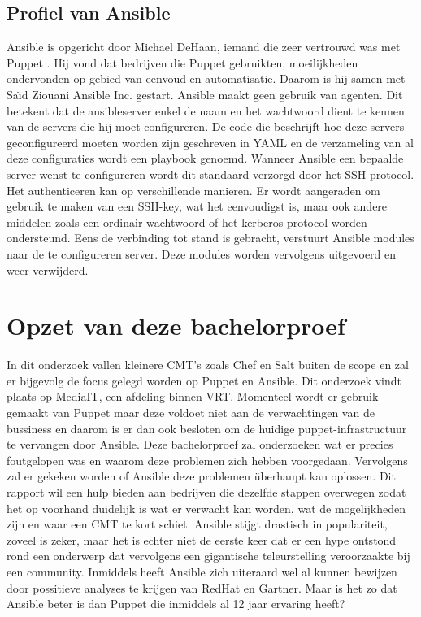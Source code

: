 \subsection{Profiel van Ansible}
Ansible is opgericht door Michael DeHaan, iemand die zeer vertrouwd was met Puppet \autocite{ansiblefordevops}. Hij vond dat bedrijven die Puppet gebruikten, moeilijkheden ondervonden op gebied van eenvoud en automatisatie. Daarom is hij samen met Sa{\"\i}d Ziouani Ansible Inc. gestart. 
Ansible maakt geen gebruik van agenten. Dit betekent dat de ansibleserver enkel de naam en het wachtwoord dient te kennen van de servers die hij moet configureren. De code die beschrijft hoe deze servers geconfigureerd moeten worden zijn geschreven in YAML en de verzameling van al deze configuraties wordt een playbook genoemd. Wanneer Ansible een bepaalde server wenst te configureren wordt dit standaard verzorgd door het SSH-protocol. Het authenticeren kan op verschillende manieren. Er wordt aangeraden om gebruik te maken van een SSH-key, wat het eenvoudigst is, maar ook andere middelen zoals een ordinair wachtwoord of het kerberos-protocol worden ondersteund. Eens de verbinding tot stand is gebracht, verstuurt Ansible modules naar de te configureren server. Deze modules worden vervolgens uitgevoerd en weer verwijderd. \autocite{ansibledoc}







\section{Opzet van deze bachelorproef}
\label{sec:opzet-bachelorproef}

In dit onderzoek vallen kleinere CMT's zoals Chef en Salt buiten de scope en zal er bijgevolg de focus gelegd worden op Puppet en Ansible. Dit onderzoek vindt plaats op MediaIT, een afdeling binnen VRT. Momenteel wordt er gebruik gemaakt van Puppet maar deze voldoet niet aan de verwachtingen van de bussiness en daarom is er dan ook besloten om de huidige puppet-infrastructuur te vervangen door Ansible.
Deze bachelorproef zal onderzoeken wat er precies foutgelopen was en waarom deze problemen zich hebben voorgedaan. Vervolgens zal er gekeken worden of Ansible deze problemen \"uberhaupt kan oplossen. Dit rapport wil een hulp bieden aan bedrijven die dezelfde stappen overwegen zodat het op voorhand duidelijk is wat er verwacht kan worden, wat de mogelijkheden zijn en waar een CMT te kort schiet. Ansible stijgt drastisch in populariteit, zoveel is zeker, maar het is echter niet de eerste keer dat er een hype ontstond rond een onderwerp dat vervolgens een gigantische teleurstelling veroorzaakte bij een community. Inmiddels heeft Ansible zich uiteraard wel al kunnen bewijzen door possitieve analyses te krijgen van RedHat en Gartner. Maar is het zo dat Ansible beter is dan Puppet die inmiddels al 12 jaar ervaring heeft?




